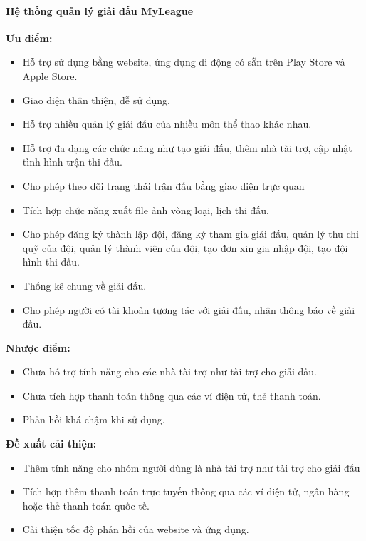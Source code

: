 \paragraph{Hệ thống quản lý giải đấu MyLeague}\mbox{}

\noindent
\textbf{Ưu điểm:}
\vspace{-0.5em}
\begin{itemize}[leftmargin=1.5cm, label={--}]
  \item Hỗ trợ sử dụng bằng website, ứng dụng di động có sẵn trên Play Store và Apple Store.
  \item Giao diện thân thiện, dễ sử dụng.
  \item Hỗ trợ nhiều quản lý giải đấu của nhiều môn thể thao khác nhau.
  \item Hỗ trợ đa dạng các chức năng như tạo giải đấu, thêm nhà tài trợ, cập nhật tình hình trận thi đấu.
  \item Cho phép theo dõi trạng thái trận đấu bằng giao diện trực quan
  \item Tích hợp chức năng xuất file ảnh vòng loại, lịch thi đấu.
  \item Cho phép đăng ký thành lập đội, đăng ký tham gia giải đấu, quản lý thu chi quỹ của đội, quản lý thành viên của đội, tạo đơn xin gia nhập đội, tạo đội hình thi đấu.
  \item Thống kê chung về giải đấu.
  \item Cho phép người có tài khoản tương tác với giải đấu, nhận thông báo về giải đấu.

\end{itemize}

\noindent
\textbf{Nhược điểm:}
\vspace{-0.5em}
\begin{itemize}[leftmargin=1.5cm, label={--}]
  \item Chưa hỗ trợ tính năng cho các nhà tài trợ như tài trợ cho giải đấu.
  \item Chưa tích hợp thanh toán thông qua các ví điện tử, thẻ thanh toán.
  \item Phản hồi khá chậm khi sử dụng.

\end{itemize}

\noindent
\textbf{Đề xuất cải thiện:}
\vspace{-0.5em}
\begin{itemize} [leftmargin=1.5cm, label={--}]
  \item Thêm tính năng cho nhóm người dùng là nhà tài trợ như tài trợ cho giải đấu
  \item Tích hợp thêm thanh toán trực tuyến thông qua các ví điện tử, ngân hàng hoặc thẻ thanh toán quốc tế.
  \item Cải thiện tốc độ phản hồi của website và ứng dụng.

\end{itemize}
